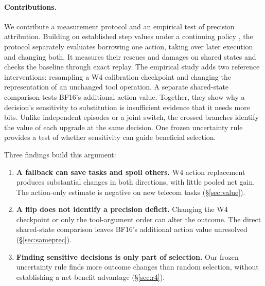\paragraph{Contributions.} We contribute a measurement protocol and an empirical test of precision attribution. Building on established step values under a continuing policy \citep{setlur2024rewarding}, the protocol separately evaluates borrowing one action, taking over later execution and changing both. It measures their rescues and damages on shared states and checks the baseline through exact replay. The empirical study adds two reference interventions: resampling a W4 calibration checkpoint and changing the representation of an unchanged tool operation. A separate shared-state comparison tests BF16's additional action value. Together, they show why a decision's sensitivity to substitution is insufficient evidence that it needs more bits. Unlike independent episodes or a joint switch, the crossed branches identify the value of each upgrade at the same decision. One frozen uncertainty rule provides a test of whether sensitivity can guide beneficial selection.

Three findings build this argument:
\begin{enumerate}[leftmargin=*,itemsep=2pt,topsep=3pt]
\item \textbf{A fallback can save tasks and spoil others.} W4 action replacement produces substantial changes in both directions, with little pooled net gain. The action-only estimate is negative on new telecom tasks (\S\ref{sec:value}).
\item \textbf{A flip does not identify a precision deficit.} Changing the W4 checkpoint or only the tool-argument order can alter the outcome. The direct shared-state comparison leaves BF16's additional action value unresolved (\S\ref{sec:sameprec}).
\item \textbf{Finding sensitive decisions is only part of selection.} Our frozen uncertainty rule finds more outcome changes than random selection, without establishing a net-benefit advantage (\S\ref{sec:r4}).
\end{enumerate}


